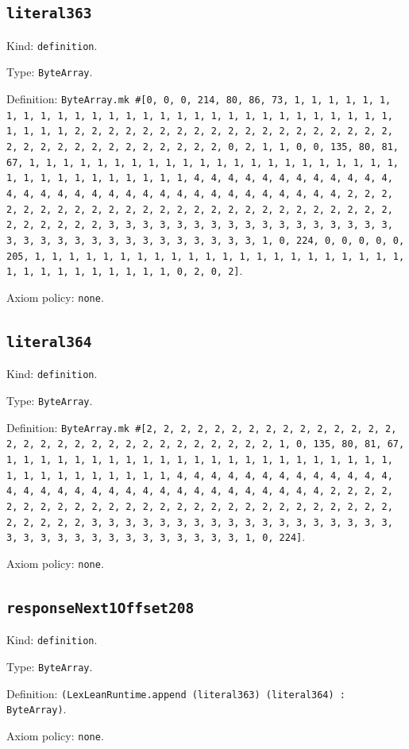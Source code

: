 \documentclass[11pt]{article}
\begin{document}
\subsection*{\texttt{literal363}}
\noindent Kind: \texttt{definition}.\par
\noindent Type: \texttt{ByteArray}.\par
\noindent Definition: \texttt{ByteArray.mk \#[0, 0, 0, 214, 80, 86, 73, 1, 1, 1, 1, 1, 1, 1, 1, 1, 1, 1, 1, 1, 1, 1, 1, 1, 1, 1, 1, 1, 1, 1, 1, 1, 1, 1, 1, 1, 1, 1, 1, 1, 2, 2, 2, 2, 2, 2, 2, 2, 2, 2, 2, 2, 2, 2, 2, 2, 2, 2, 2, 2, 2, 2, 2, 2, 2, 2, 2, 2, 2, 2, 2, 2, 0, 2, 1, 1, 0, 0, 135, 80, 81, 67, 1, 1, 1, 1, 1, 1, 1, 1, 1, 1, 1, 1, 1, 1, 1, 1, 1, 1, 1, 1, 1, 1, 1, 1, 1, 1, 1, 1, 1, 1, 1, 1, 1, 4, 4, 4, 4, 4, 4, 4, 4, 4, 4, 4, 4, 4, 4, 4, 4, 4, 4, 4, 4, 4, 4, 4, 4, 4, 4, 4, 4, 4, 4, 4, 4, 2, 2, 2, 2, 2, 2, 2, 2, 2, 2, 2, 2, 2, 2, 2, 2, 2, 2, 2, 2, 2, 2, 2, 2, 2, 2, 2, 2, 2, 2, 2, 2, 3, 3, 3, 3, 3, 3, 3, 3, 3, 3, 3, 3, 3, 3, 3, 3, 3, 3, 3, 3, 3, 3, 3, 3, 3, 3, 3, 3, 3, 3, 3, 3, 1, 0, 224, 0, 0, 0, 0, 0, 205, 1, 1, 1, 1, 1, 1, 1, 1, 1, 1, 1, 1, 1, 1, 1, 1, 1, 1, 1, 1, 1, 1, 1, 1, 1, 1, 1, 1, 1, 1, 1, 1, 0, 2, 0, 2]}.\par
\noindent Axiom policy: \texttt{none}.\par
\subsection*{\texttt{literal364}}
\noindent Kind: \texttt{definition}.\par
\noindent Type: \texttt{ByteArray}.\par
\noindent Definition: \texttt{ByteArray.mk \#[2, 2, 2, 2, 2, 2, 2, 2, 2, 2, 2, 2, 2, 2, 2, 2, 2, 2, 2, 2, 2, 2, 2, 2, 2, 2, 2, 2, 2, 2, 2, 1, 0, 135, 80, 81, 67, 1, 1, 1, 1, 1, 1, 1, 1, 1, 1, 1, 1, 1, 1, 1, 1, 1, 1, 1, 1, 1, 1, 1, 1, 1, 1, 1, 1, 1, 1, 1, 1, 1, 4, 4, 4, 4, 4, 4, 4, 4, 4, 4, 4, 4, 4, 4, 4, 4, 4, 4, 4, 4, 4, 4, 4, 4, 4, 4, 4, 4, 4, 4, 4, 4, 2, 2, 2, 2, 2, 2, 2, 2, 2, 2, 2, 2, 2, 2, 2, 2, 2, 2, 2, 2, 2, 2, 2, 2, 2, 2, 2, 2, 2, 2, 2, 2, 3, 3, 3, 3, 3, 3, 3, 3, 3, 3, 3, 3, 3, 3, 3, 3, 3, 3, 3, 3, 3, 3, 3, 3, 3, 3, 3, 3, 3, 3, 3, 3, 1, 0, 224]}.\par
\noindent Axiom policy: \texttt{none}.\par
\subsection*{\texttt{responseNext1Offset208}}
\noindent Kind: \texttt{definition}.\par
\noindent Type: \texttt{ByteArray}.\par
\noindent Definition: \texttt{(LexLeanRuntime.append (literal363) (literal364) : ByteArray)}.\par
\noindent Axiom policy: \texttt{none}.\par
\end{document}
